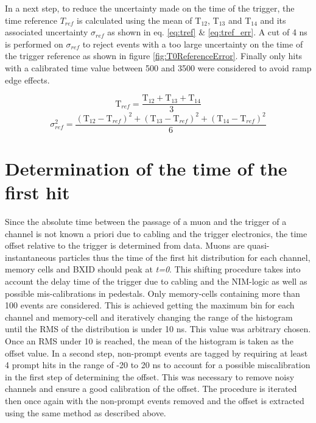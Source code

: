 In a next step, to reduce the uncertainty made on the time of the trigger, the time reference $T_{ref}$ is calculated using the mean of T$_{12}$, T$_{13}$ and T$_{14}$ and its associated uncertainty $\sigma_{ref}$ as shown in eq. \ref{eq:tref} \& \ref{eq:tref_err}. A cut of 4 ns is performed on $\sigma_{ref}$ to reject events with a too large uncertainty on the time of the trigger reference as shown in figure \ref{fig:T0ReferenceError}. Finally only hits with a calibrated time value between 500 and 3500 were considered to avoid ramp edge effects.

\begin{equation} \label{eq:tref}
	\text{T}_{ref} = \frac{\text{T}_{12} + \text{T}_{13} + \text{T}_{14}}{3}
\end{equation}
\begin{equation} \label{eq:tref_err}
	\sigma_{ref}^2 = \frac{ (\text{T}_{12} - \text{T}_{ref})^2 + (\text{T}_{13} - \text{T}_{ref})^2  + (\text{T}_{14} - \text{T}_{ref})^2 }{6}
\end{equation}

\section{Determination of the time of the first hit}

Since the absolute time between the passage of a muon and the trigger of a channel is not known a priori due to cabling and the trigger electronics, the time offset relative to the trigger is determined from data. Muons are quasi-instantaneous particles thus the time of the first hit distribution for each channel, memory cells and BXID should peak at \textit{t=0}. This shifting procedure takes into account the delay time of the trigger due to cabling and the NIM-logic as well as possible mis-calibrations in pedestals. Only memory-cells containing more than 100 events are considered. This is achieved getting the maximum bin for each channel and memory-cell and iteratively changing the range of the histogram until the RMS of the distribution is under 10 ns. This value was arbitrary chosen. Once an RMS under 10 is reached, the mean of the histogram is taken as the offset value. In a second step, non-prompt events are tagged by requiring at least 4 prompt hits in the range of -20 to 20 ns to account for a possible miscalibration in the first step of determining the offset. This was necessary to remove noisy channels and ensure a good calibration of the offset. The procedure is iterated then once again with the non-prompt events removed and the offset is extracted using the same method as described above.


